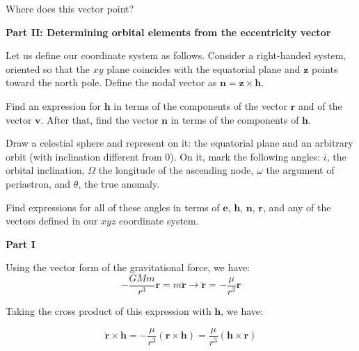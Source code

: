 \documentclass[11pt]{article}
\begin{document}
\begin{pproblem}
\begin{alternativas}
        Where does this vector point?
    \end{alternativas}
    \begin{center}
        \textbf{Part II: Determining orbital elements from the eccentricity vector}     
    \end{center}
    Let us define our coordinate system as follows. Consider a right-handed system, oriented so that the \(xy\) plane coincides with the equatorial plane and \(\mathbf{z}\) points toward the north pole. Define the nodal vector as \(\mathbf{n} = \mathbf{z} \times \mathbf{h}\).
    \begin{alternativas}
        \item Find an expression for \(\mathbf{h}\) in terms of the components of the vector \(\mathbf{r}\) and of the vector \(\mathbf{v}\). After that, find the vector \(\mathbf{n}\) in terms of the components of \(\mathbf{h}\).

        \item Draw a celestial sphere and represent on it: the equatorial plane and an arbitrary orbit (with inclination different from 0). On it, mark the following angles: \(i\), the orbital inclination, \(\Omega\) the longitude of the ascending node, \(\omega\) the argument of periastron, and \(\theta\), the true anomaly. 

        \item Find expressions for all of these angles in terms of \(\mathbf{e}\), \(\mathbf{h}\), \(\mathbf{n}\), \(\mathbf{r}\), and any of the vectors defined in our \(xyz\) coordinate system.
    \end{alternativas}

    \begin{pssolution*}{}{}
        \begin{center}
            \textbf{Part I}
        \end{center}
        \begin{alternativas}
            \item Using the vector form of the gravitational force, we have:
            \[-\frac{GMm}{r^3}\mathbf{r} = m\ddot{\mathbf{r}} \rightarrow \boxed{\ddot{\mathbf{r}}= -\frac{\mu}{r^3}\mathbf{r}}\]

            \item Taking the cross product of this expression with \(\mathbf{h}\), we have:
            
            \[\ddot{\mathbf{r}}\times \mathbf{h} = -\frac{\mu}{r^3}(\mathbf{r}\times\mathbf{h}) = \frac{\mu}{r^3}(\mathbf{h}\times\mathbf{r})\]


\end{alternativas}
\end{pssolution*}
\end{pproblem}
\end{document}
